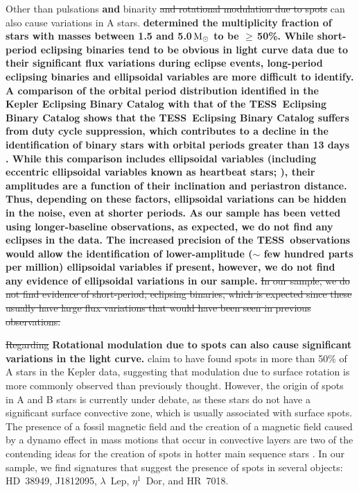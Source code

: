 \documentclass[twocolumn, linenumbers]{aastex631}
\newcommand{\tess}{TESS}
\begin{document}
Other than pulsations \textbf{and} binarity {\st{and rotational modulation due to spots}} can also cause variations in A stars. {\bf{\citet{Duchene2013} determined the multiplicity fraction of stars with masses between 1.5 and 5.0\,{{$\rm M_{\odot}$}} to be $\ge$\,50\%. While short-period eclipsing binaries tend to be obvious in light curve data due to their significant flux variations during eclipse events, long-period eclipsing binaries and ellipsoidal variables are more difficult to identify. A comparison of the orbital period distribution identified in the Kepler Eclipsing Binary Catalog \citep{Kirk2016} with that of the \tess\ Eclipsing Binary Catalog \citep{Prsa2021} shows that the \tess\ Eclipsing Binary Catalog suffers from duty cycle suppression, which contributes to a decline in the identification of binary stars with orbital periods greater than 13 days \citep{Prsa2021}. While this comparison includes ellipsoidal variables (including eccentric ellipsoidal variables known as heartbeat stars; \citealt{Thompson2012}), their amplitudes are a function of their inclination and periastron distance. Thus, depending on these factors, ellipsoidal variations can be hidden in the noise, even at shorter periods. As our sample has been vetted using longer-baseline observations, as expected, we do not find any eclipses in the data. The increased precision of the \tess\ observations would allow the identification of lower-amplitude ($\sim$ few hundred parts per million) ellipsoidal variables if present, however, we do not find any evidence of ellipsoidal variations in our sample.}}
{\st{In our sample, we do not find evidence of short-period, eclipsing binaries, which is expected since these usually have large flux variations that would have been seen in previous observations.}} 

{\st{Regarding}} {\bf{Rotational modulation due to spots can also cause significant variations in the light curve.}} \citet{Balona2013, Balona2017} claim to have found spots in more than 50\% of A stars in the Kepler data, suggesting that modulation due to surface rotation is more commonly observed than previously thought. However, the origin of spots in A and B stars is currently under debate, as these stars do not have a significant surface convective zone, which is usually associated with surface spots. The presence of a fossil magnetic field \citep{Parker1955} and the creation of a magnetic field caused by a dynamo effect in mass motions that occur in convective layers \citep{Charbonneau2014} are two of the contending ideas for the creation of spots in hotter main sequence stars {\bf\citep{Balona2021}}. In our sample, we find signatures that suggest the presence of spots in several objects:  HD~38949, J1812095, $\lambda$~Lep, $\eta^1$~Dor, and HR~7018.
\end{document}
